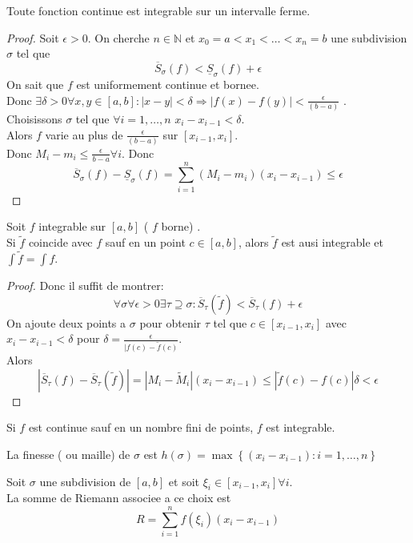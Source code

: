 \documentclass[../main.tex]{subfiles}
\begin{document}
\begin{thm}
Toute fonction continue est integrable sur un intervalle ferme.
\end{thm}
\begin{proof}
Soit $\epsilon>0$. On cherche $n \in \mathbb{N}$ et $x_0= a < x_1< \ldots < x_n=b$ une subdivision $\sigma$ tel que
\[ 
	\overline{S}_\sigma( f) <\underline{S}_\sigma( f) + \epsilon
\]
On sait que $f$ est uniformement continue et bornee.\\
Donc $\exists \delta>0 \forall x, y \in [ a,b]: |x-y|< \delta \Rightarrow |f( x) - f( y) |< \frac{\epsilon}{( b-a)}$ .\\
Choisissons $\sigma$ tel que $\forall i=1,\ldots,n$ $x_i - x_{i-1} <\delta$.\\
Alors $f$ varie au plus de $\frac{\epsilon}{(  b-a) }$ sur $[x_{i-1} ,x_i]$.\\
Donc $M_i - m_i \leq \frac{\epsilon}{b-a}\forall i$. Donc
\[ 
	\overline{S}_\sigma( f) - \underline{S}_\sigma( f) = \sum_{i=1}^{ n}( M_i-m_i) ( x_i - x_{i-1} ) \leq \epsilon
\]
\end{proof}

\begin{thm}
	Soit $f$ integrable sur $[a,b]$ ( $f$ borne) .\\
	Si $\tilde f$ coincide avec $f$ sauf en un point $c\in [ a,b] $, alors $\tilde f$ est ausi integrable et $\int \tilde f = \int f$.
\end{thm}
\begin{proof}
Donc il suffit de montrer:
\[ 
	\forall \sigma \forall \epsilon>0 \exists \tau\supseteq \sigma: \overline{S}_\tau( \tilde f) < \overline{S}_\tau( f) + \epsilon
\]
On ajoute deux points a $\sigma$ pour obtenir $\tau$ tel que $c\in [ x_{i-1} ,x_i] $ avec $x_i - x_{i-1} < \delta$ pour $\delta= \frac{\epsilon}{|f( c) - \tilde f ( c) }$.\\
Alors
\[ 
	|	\overline{S}_\tau( f) - \overline{S}_\tau( \tilde f) | = |M_i - \tilde M _i|( x_i - x_{i-1} ) \leq |\tilde f ( c) - f( c) | \delta < \epsilon
\]

\end{proof}
\begin{crly}
	Si $f$ est continue sauf en un nombre fini de points, $f$ est integrable.
\end{crly}
\begin{defn}
	La finesse ( ou maille) de $\sigma$ est $h( \sigma) = \max \left\{ ( x_i - x_{i-1} ) : i = 1, \ldots, n \right\} $
\end{defn}
\begin{defn}
	Soit $\sigma$ une subdivision de $[a,b]$ et soit $\xi_i \in [ x_{i-1} ,x_i] \forall i$.\\
	La somme de Riemann associee a ce choix est 
	\[ 
		R= \sum_{i=1}^{ n}f( \xi_i) ( x_i- x_{i-1} ) 
	\]
	
\end{defn}
\end{document}
